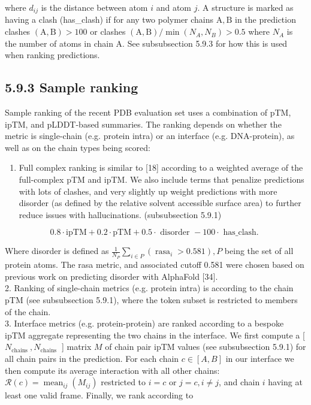 \documentclass[10pt]{article}
\begin{document}
where $d_{i j}$ is the distance between atom $i$ and atom $j$. A structure is marked as having a clash (has\_clash) if for any two polymer chains $\mathrm{A}, \mathrm{B}$ in the prediction clashes $(\mathrm{A}, \mathrm{B})>100$ or clashes $(\mathrm{A}, \mathrm{B}) / \min \left(N_{A}, N_{B}\right)>0.5$ where $N_{A}$ is the number of atoms in chain A. See subsubsection 5.9.3 for how this is used when ranking predictions.

\subsection*{5.9.3 Sample ranking}
Sample ranking of the recent PDB evaluation set uses a combination of pTM, ipTM, and pLDDT-based summaries. The ranking depends on whether the metric is single-chain (e.g. protein intra) or an interface (e.g. DNA-protein), as well as on the chain types being scored:

\begin{enumerate}
  \item Full complex ranking is similar to [18] according to a weighted average of the full-complex pTM and ipTM. We also include terms that penalize predictions with lots of clashes, and very slightly up weight predictions with more disorder (as defined by the relative solvent accessible surface area) to further reduce issues with hallucinations. (subsubsection 5.9.1)
\end{enumerate}


\begin{equation*}
0.8 \cdot \mathrm{ipTM}+0.2 \cdot \mathrm{pTM}+0.5 \cdot \text { disorder }-100 \cdot \text { has_clash. } \tag{19}
\end{equation*}


Where disorder is defined as $\frac{1}{N_{P}} \sum_{i \in P}\left(\operatorname{rasa}_{i}>0.581\right), P$ being the set of all protein atoms. The rasa metric, and associated cutoff 0.581 were chosen based on previous work on predicting disorder with AlphaFold [34].\\
2. Ranking of single-chain metrics (e.g. protein intra) is according to the chain pTM (see subsubsection 5.9.1), where the token subset is restricted to members of the chain.\\
3. Interface metrics (e.g. protein-protein) are ranked according to a bespoke ipTM aggregate representing the two chains in the interface. We first compute a [ $N_{\text {chains }}, N_{\text {chains }}$ ] matrix $M$ of chain pair ipTM values (see subsubsection 5.9.1) for all chain pairs in the prediction. For each chain $c \in[A, B]$ in our interface we then compute its average interaction with all other chains: $\mathcal{R}(c)=\operatorname{mean}_{i j}\left(M_{i j}\right)$ restricted to $i=c$ or $j=c, i \neq j$, and chain $i$ having at least one valid frame. Finally, we rank according to
\end{document}
